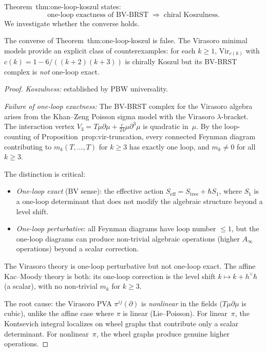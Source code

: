 \documentclass[11pt]{article}
\begin{document}
Theorem~thm:one-loop-koszul states:
\[
\text{one-loop exactness of BV-BRST}
\;\Longrightarrow\;
\text{chiral Koszulness}.
\]
We investigate whether the converse holds.

\begin{proposition}
\label{prop:one-loop-not-sharp}
The converse of Theorem~thm:one-loop-koszul
is false.  The Virasoro minimal models provide an explicit
class of counterexamples: for each $k \geq 1$,
$\mathrm{Vir}_{c(k)}$ with $c(k) = 1 - 6/((k{+}2)(k{+}3))$
is chirally Koszul but its BV-BRST complex is \emph{not}
one-loop exact.
\end{proposition}

\begin{proof}
\emph{Koszulness:} established by PBW universality.

\emph{Failure of one-loop exactness:}
The BV-BRST complex for the Virasoro algebra arises
from the Khan--Zeng Poisson sigma model with the Virasoro
$\lambda$-bracket.  The interaction vertex
$V_3 = T\mu\partial\mu + \frac{c}{24}\mu\partial^3\mu$
is quadratic in~$\mu$.  By the loop-counting of
Proposition~prop:vir-truncation, every connected
Feynman diagram contributing to $m_k(T,\ldots,T)$ for
$k \geq 3$ has exactly one loop, and $m_k \neq 0$ for all
$k \geq 3$.

The distinction is critical:
\begin{itemize}[nosep]
\item \emph{One-loop exact} (BV sense): the effective
  action $S_{\mathrm{eff}} = S_{\mathrm{tree}} +
  \hbar S_1$, where $S_1$ is a one-loop determinant
  that does not modify the algebraic structure beyond
  a level shift.
\item \emph{One-loop perturbative}: all Feynman diagrams
  have loop number $\leq 1$, but the one-loop diagrams
  can produce non-trivial algebraic operations (higher
  $A_\infty$ operations) beyond a scalar correction.
\end{itemize}
The Virasoro theory is one-loop perturbative but not
one-loop exact.  The affine Kac--Moody theory is both:
its one-loop correction is the level shift
$k \mapsto k + h^\vee\hbar$ (a scalar), with no
non-trivial $m_k$ for $k \geq 3$.

The root cause: the Virasoro PVA $\pi^{ij}(\partial)$
is \emph{nonlinear} in the fields ($T\mu\partial\mu$ is
cubic), unlike the affine case where $\pi$ is linear
(Lie--Poisson).  For linear~$\pi$, the Kontsevich integral
localizes on wheel graphs that contribute only a scalar
determinant.  For nonlinear~$\pi$, the wheel graphs produce
genuine higher operations.
\end{proof}
\end{document}
